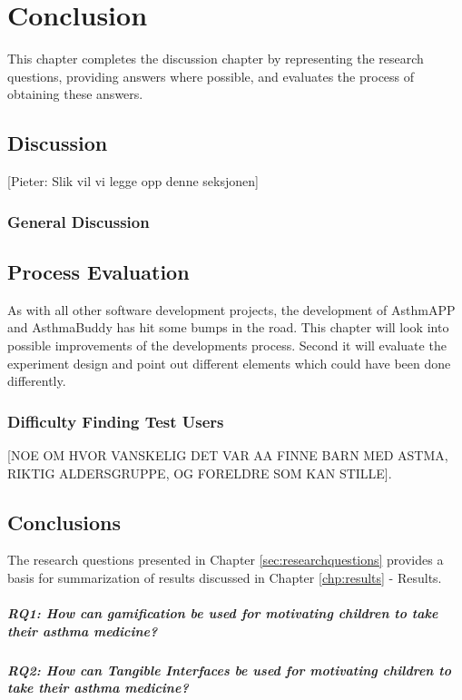 \chapter{Conclusion}
\label{chp:masterconclusion}

This chapter completes the discussion chapter by representing the research questions, providing answers where possible, and evaluates the process of obtaining these answers. 

\section{Discussion}
\label{sec:discussion}
[Pieter: Slik vil vi legge opp denne seksjonen]

\subsection{General Discussion}
\label{sec:generaldiscussion}



\section{Process Evaluation}
\label{sec:processevaluation}
As with all other software development projects, the development of AsthmAPP and AsthmaBuddy has hit some bumps in the road. This chapter will look into possible improvements of the developments process. Second it will evaluate the experiment design and point out different elements which could have been done differently.

\subsection{Difficulty Finding Test Users}
\label{sec:difficultyfindingtestusers}
[NOE OM HVOR VANSKELIG DET VAR AA FINNE BARN MED ASTMA, RIKTIG ALDERSGRUPPE, OG FORELDRE SOM KAN STILLE].

  
\section{Conclusions}
\label{conlusions}

The research questions presented in Chapter \ref{sec:researchquestions} provides a basis for summarization of results discussed in Chapter \ref{chp:results} - Results. 

\paragraph{RQ1: How can gamification be used for motivating children to take their asthma medicine?}



\paragraph{RQ2: How can Tangible Interfaces be used for motivating children to take their asthma medicine?}





